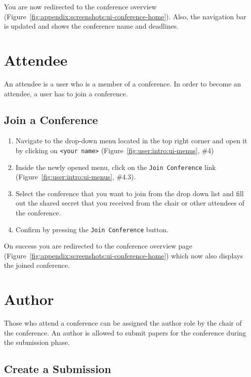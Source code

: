 \documentclass[nochapterpage,nopartpage,noheadingspace,numbersubsubsec,bigchapter,colorback,accentcolor=tud9c,10pt]{tudreport}
\begin{document}
    \noindent
    You are now redirected to the conference overview (Figure~\ref{fig:appendix:screenshots:ui-conference-home}). Also, the navigation bar is updated and shows the conference name and deadlines.

  \chapter{Attendee}
  \label{ch:user:attendee}

    An attendee is a user who is a member of a conference. In order to become an attendee, a user has to join a conference.

  \section{Join a Conference}
  \label{ch:user:attendee:join-conference}

        \begin{enumerate}
            \setlength\itemsep{0em}
            \item Navigate to the drop-down menu located in the top right corner and open it by clicking on \texttt{<your name>} (Figure~\ref{fig:user:intro:ui-menus}, \#4)
            \item Inside the newly opened menu, click on the \texttt{Join Conference} link (Figure~\ref{fig:user:intro:ui-menus}, \#4.3).
            \item Select the conference that you want to join from the drop down list and fill out the shared secret that you received from the chair or other attendees of the conference.
            \item Confirm by pressing the \texttt{Join Conference} button.
        \end{enumerate}

    On success you are redirected to the conference overview page (Figure~\ref{fig:appendix:screenshots:ui-conference-home}) which now also displays the joined conference.

  \chapter{Author}
  \label{ch:user:author}

    Those who attend a conference can be assigned the author role by the chair of the conference. An author is allowed to submit papers for the conference during the submission phase.

  \section{Create a Submission}
  \label{ch:user:author:create-submission}
\end{document}
